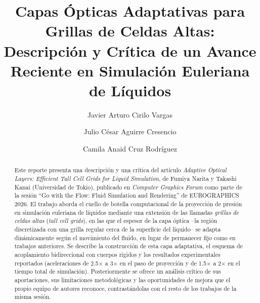 \documentclass[sigconf,nonacm]{acmart}
\begin{document}
\title{Capas Ópticas Adaptativas para Grillas de Celdas Altas: Descripción y Crítica de un Avance Reciente en Simulación Euleriana de Líquidos}

\author{Javier Arturo Cirilo Vargas}

\author{Julio César Aguirre Cresencio}

\author{Camila Anaid Cruz Rodríguez}

\begin{abstract}
Este reporte presenta una descripción y una crítica del artículo \emph{Adaptive Optical Layers: Efficient Tall Cell Grids for Liquid Simulation}, de Fumiya Narita y Takashi Kanai (Universidad de Tokio), publicado en \emph{Computer Graphics Forum} como parte de la sesión ``Go with the Flow: Fluid Simulation and Rendering'' de EUROGRAPHICS 2026. El trabajo aborda el cuello de botella computacional de la proyección de presión en simulación euleriana de líquidos mediante una extensión de las llamadas \emph{grillas de celdas altas} (\emph{tall cell grids}), en las que el espesor de la capa óptica --la región discretizada con una grilla regular cerca de la superficie del líquido-- se adapta dinámicamente según el movimiento del fluido, en lugar de permanecer fijo como en trabajos anteriores. Se describe la construcción de esta capa adaptativa, el esquema de acoplamiento bidireccional con cuerpos rígidos y los resultados experimentales reportados (aceleraciones de 2.5$\times$ a 3$\times$ en el paso de proyección y de 1.5$\times$ a 2$\times$ en el tiempo total de simulación). Posteriormente se ofrece un análisis crítico de sus aportaciones, sus limitaciones metodológicas y las oportunidades de mejora que el propio equipo de autores reconoce, contrastándolas con el resto de los trabajos de la misma sesión.
\end{abstract}

\maketitle
\end{document}
